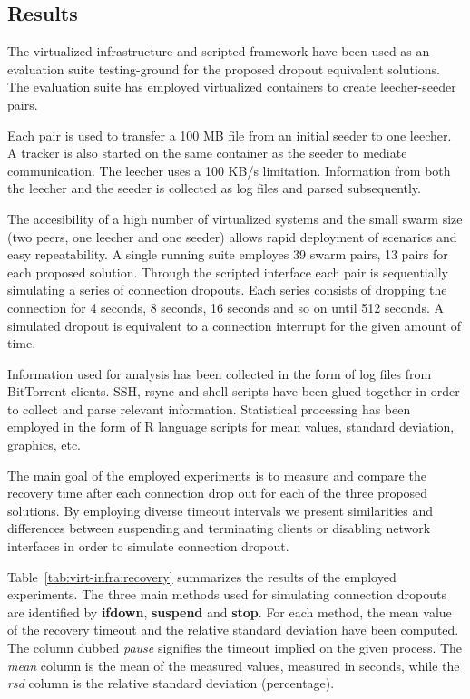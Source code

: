 \subsection{Results}
\label{subsec:virt-infra:results-dropouts}

The virtualized infrastructure and scripted framework have been used as an
evaluation suite testing-ground for the proposed dropout equivalent solutions.
The evaluation suite has employed virtualized containers to create
leecher-seeder pairs.

Each pair is used to transfer a 100 MB file from an initial seeder to one
leecher. A tracker is also started on the same container as the seeder to
mediate communication. The leecher uses a 100 KB/s limitation. Information
from both the leecher and the seeder is collected as log files and parsed
subsequently.

The accesibility of a high number of virtualized systems and the small swarm
size (two peers, one leecher and one seeder) allows rapid deployment of
scenarios and easy repeatability. A single running suite employes 39 swarm
pairs, 13 pairs for each proposed solution. Through the scripted interface
each pair is sequentially simulating a series of connection dropouts. Each
series consists of dropping the connection for 4 seconds, 8 seconds, 16
seconds and so on until 512 seconds. A simulated dropout is equivalent to a
connection interrupt for the given amount of time.

Information used for analysis has been collected in the form of log files from
BitTorrent clients. SSH, rsync and shell scripts have been glued together in
order to collect and parse relevant information. Statistical processing has
been employed in the form of R language scripts for mean values, standard
deviation, graphics, etc.

The main goal of the employed experiments is to measure and compare the
recovery time after each connection drop out for each of the three proposed
solutions. By employing diverse timeout intervals we present similarities and
differences between suspending and terminating clients or disabling network
interfaces in order to simulate connection dropout.



Table~\ref{tab:virt-infra:recovery} summarizes the results of the employed
experiments.  The three main methods used for simulating connection dropouts
are identified by \textbf{ifdown}, \textbf{suspend} and \textbf{stop}. For
each method, the mean value of the recovery timeout and the relative standard
deviation have been computed. The column dubbed \textit{pause} signifies the
timeout implied on the given process. The \textit{mean} column is the mean of
the measured values, measured in seconds, while the \textit{rsd} column is the
relative standard deviation (percentage).

